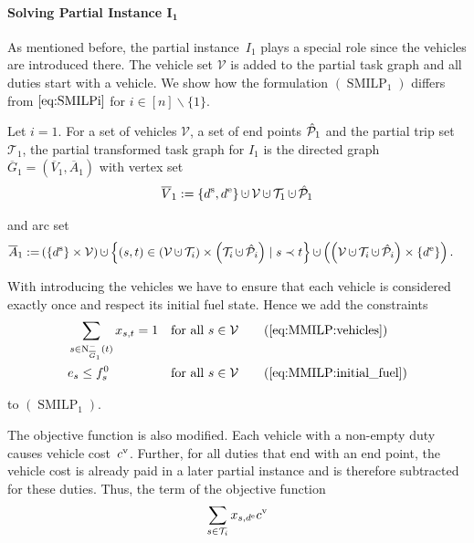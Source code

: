 \paragraph{Solving Partial Instance $\boldsymbol{I_1}$} \parfill

As mentioned before, the partial instance~$I_1$ plays a special role since the vehicles are introduced there. The vehicle set $\mathcal{V}$ is added to the partial task graph and all duties start with a vehicle. We show how the formulation $(\operatorname{SMILP}_1)$ differs from $\eqref{eq:SMILPi}$ for ${i\in[n]\backslash\{1\}}$.

\begin{definition}

Let $i=1$. For a set of vehicles $\mathcal{V}$, a set of end points $\hat{\mathcal{P}}_1$ and the partial trip set $\mathcal{T}_1$, the partial transformed task graph for $I_1$ is the directed graph $\overline{G}_1=\left(\overline{V}_1,\overline{A}_1\right)$ with vertex set
\begin{align*}
	\overline{V}_1 := \left\{\ds,\de\right\}\cupdot\mathcal{V}\cupdot\mathcal{T}_1\cupdot\Phat_1
\end{align*}

and arc set
\begin{align*}
	\overline{A}_1 := & \left(\left\{\ds\right\}\times\mathcal{V}\right)\cupdot\left\{(s,t)\in\left(\mathcal{V}\cupdot\Ti\right)\times\left(\Ti\cupdot\Phat_i\right)\mid s\prec t\right\} \cupdot\left(\left(\mathcal{V}\cupdot\Ti\cupdot\Phat_i\right)\times\left\{\de\right\}\right).
\end{align*}

\end{definition}

With introducing the vehicles we have to ensure that each vehicle is considered exactly once and respect its initial fuel state. Hence we add the constraints
\begin{align}
	& \sum_{s\in\operatorname{N}^-_{\overline{G}_1}(t)} x_{s,t} = 1 && \text{for all } s\in\mathcal{V} \tag{\ref{eq:MMILP:vehicles}} \\
	& e_s \leq f^0_s && \text{for all } s\in\mathcal{V} \tag{\ref{eq:MMILP:initial_fuel}}
\end{align}

to $(\operatorname{SMILP}_1)$.

The objective function is also modified. Each vehicle with a non-empty duty causes vehicle cost~$c^{\operatorname{v}}$. Further, for all duties that end with an end point, the vehicle cost is already paid in a later partial instance and is therefore subtracted for these duties. Thus, the term of the objective function
\begin{align*}
	\sum_{s\in\mathcal{T}_i} x_{s,d^{\operatorname{e}}}c^{\operatorname{v}}
\end{align*}

